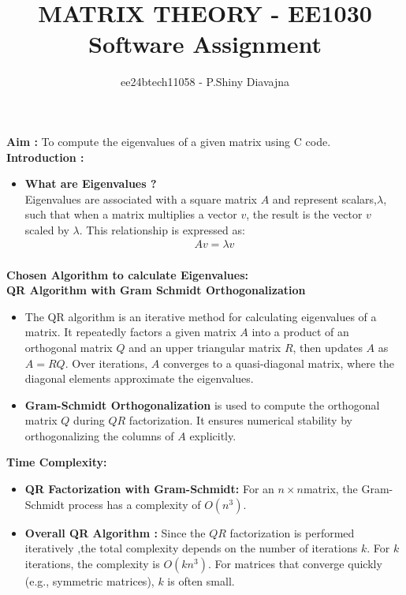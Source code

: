 \documentclass[journal,12pt,onecolumn]{IEEEtran}
\theoremstyle{remark}
\begin{document}
\title{{MATRIX THEORY - EE1030}\\
Software Assignment}

\author{ee24btech11058 - P.Shiny Diavajna}
\maketitle
\renewcommand{\thefigure}{\theenumi}
\renewcommand{\thetable}{\theenumi}

 \textbf{Aim :} To compute the eigenvalues of a given matrix using C code.\\

 \textbf{Introduction :} \\
 \begin{itemize}
     \item \textbf{What are Eigenvalues ?}\\
 Eigenvalues are associated with a square matrix $A$ and represent scalars,$\lambda$, such that when a matrix multiplies a vector $v$, the result is the vector $v$ scaled by $\lambda$. This relationship is expressed as:
    \begin{align*}
        Av=\lambda v\\
    \end{align*}
  
    
 \end{itemize}
\textbf{Chosen Algorithm to calculate Eigenvalues:}\\

\textbf{QR Algorithm with Gram Schmidt Orthogonalization }
    \begin{itemize}
    \item   The QR algorithm is an iterative method for calculating eigenvalues of a matrix. It repeatedly factors a given matrix $A$ into a product of an orthogonal matrix $Q$ and an upper triangular matrix $R$, then updates $A$ as $A=RQ$. Over iterations, $A$ converges to a quasi-diagonal matrix, where the diagonal elements approximate the eigenvalues.

    \item \textbf{Gram-Schmidt Orthogonalization} is used to compute the orthogonal matrix $Q$ during $QR$ factorization. It ensures numerical stability by orthogonalizing the columns of $A$ explicitly.\\
     \end{itemize}

\textbf{Time Complexity:}

\begin{itemize}
    \item  \textbf{QR Factorization with Gram-Schmidt:} For an $n\times n$matrix, the Gram-Schmidt process has a complexity of $O(n^3)$.
    \item  \textbf{Overall QR Algorithm :} Since the $QR$ factorization is performed iteratively ,the total complexity depends on the number of iterations $k$. For $k$ iterations, the complexity is  $O(kn^3).$
    For matrices that converge quickly (e.g., symmetric matrices), $k$ is often small.\\
\end{itemize}
\end{document}
